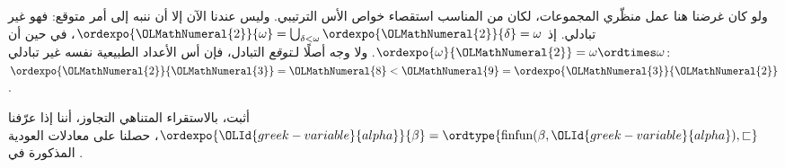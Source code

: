 \documentclass[../../../include/open-logic-section]{subfiles}
\begin{document}
ولو كان غرضنا هنا عمل منظّري المجموعات، لكان من المناسب استقصاء خواص
الأس الترتيبي. وليس عندنا الآن إلا أن ننبه إلى أمر متوقع: فهو غير
تبادلي. إذ
$\ordexpo{\OLMathNumeral{2}}{\omega} =
\bigcup_{\delta < \omega}\ordexpo{\OLMathNumeral{2}}{\delta} = \omega$، في حين أن
$\ordexpo{\omega}{\OLMathNumeral{2}} = \omega \ordtimes \omega$. ولا وجه أصلًا
لـ\emph{توقع} التبادل، فإن أس الأعداد الطبيعية نفسه غير تبادلي:
$\ordexpo{\OLMathNumeral{2}}{\OLMathNumeral{3}} = \OLMathNumeral{8} < \OLMathNumeral{9} = \ordexpo{\OLMathNumeral{3}}{\OLMathNumeral{2}}$.

\begin{prob}
أثبت، بالاستقراء المتناهي التجاوز، أننا إذا عرّفنا
$\ordexpo{\OLId{greek-variable}{alpha}}{\beta} =
\ordtype{\text{finfun}(\beta, \OLId{greek-variable}{alpha}), \sqsubset}$، حصلنا على
معادلات العودية المذكورة في
.
\end{prob}
\end{document}
